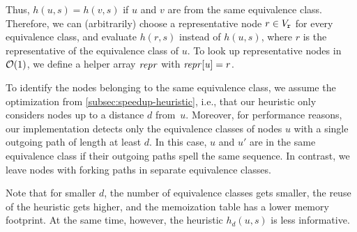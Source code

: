 Thus, $h(u,s)=h(v,s)$ if $u$ and $v$ are from the same equivalence class.
Therefore, we can (arbitrarily) choose a representative node $r \in V_\texttt{r}$ for
every equivalence class, and evaluate $h(r,s)$ instead of $h(u,s)$, where $r$ is
the representative of the equivalence class of $u$. To look up representative
nodes in $\mathcal{O}(1)$, we define a helper array $\mathit{repr}$ with $\mathit{repr[u]} =
r$.

To identify the nodes belonging to the same equivalence class, we assume the
optimization from \cref{subsec:speedup-heuristic}, i.e., that our heuristic only
considers nodes up to a distance $d$ from~$u$.
%
Moreover, for performance reasons, our implementation detects only the
equivalence classes of nodes $u$ with a single outgoing path of length at least
$d$.
%
In this case, $u$ and $u'$ are in the same equivalence class if their outgoing
paths spell the same sequence.
%
In contrast, we leave nodes with forking paths in separate equivalence classes.

Note that for smaller $d$, the number of equivalence classes gets smaller, the
reuse of the heuristic gets higher, and the memoization table has a lower memory
footprint. At the same time, however, the heuristic $h_d(u,s)$ is less
informative.
